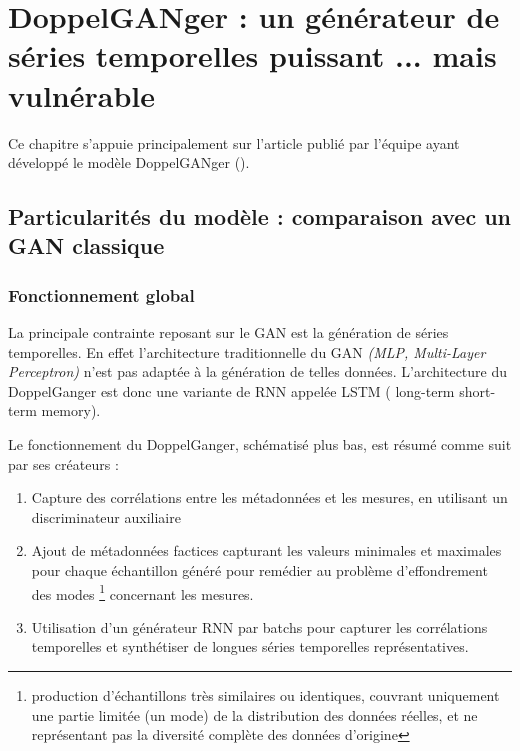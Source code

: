 \chapter{DoppelGANger : un générateur de séries temporelles puissant ... mais vulnérable}
    Ce chapitre s'appuie principalement sur l'article publié par l'équipe ayant développé le
    modèle DoppelGANger (\cite{doppelGANger}).
    \section{Particularités du modèle : comparaison avec un GAN classique}

        \subsection{Fonctionnement global}
            La principale contrainte reposant sur le GAN est la génération de séries
            temporelles. En effet l'architecture traditionnelle du GAN
            \textit{(MLP, Multi-Layer Perceptron)} n'est pas adaptée à la génération de telles
            données. L'architecture du DoppelGanger est donc une variante de RNN appelée LSTM (
            long-term short-term memory).

            Le fonctionnement du DoppelGanger, schématisé plus bas, est résumé comme suit par ses
            créateurs :

            \begin{enumerate}
                \item Capture des corrélations entre les métadonnées et les mesures, en
                utilisant un discriminateur auxiliaire
                \item Ajout de
                métadonnées factices capturant les valeurs minimales et maximales pour chaque
                échantillon généré pour remédier au problème d'effondrement des modes
                \footnote{production d'échantillons très similaires ou identiques, couvrant uniquement
                une partie limitée (un mode) de la distribution des données réelles, et ne représentant pas
                la diversité complète des données d'origine} concernant les mesures.
                \item Utilisation d'un générateur RNN par batchs
                pour capturer les corrélations temporelles et synthétiser de longues séries temporelles représentatives.
            \end{enumerate}

